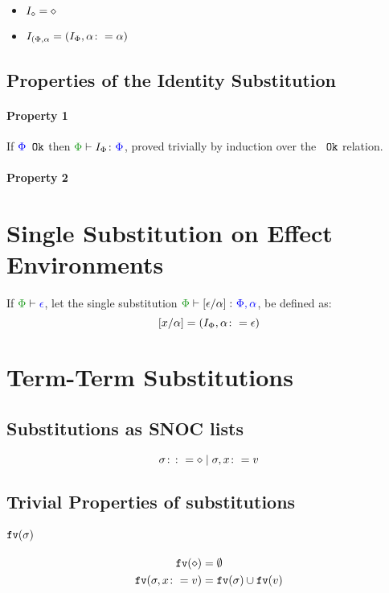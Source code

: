 {\begin{itemize}
\item $I_{\diamond} = \diamond$
\item $I_{(\Phi, \alpha} = (I_{\Phi}, \alpha\colon= \alpha)$
\end{itemize}

\subsection{Properties of the Identity Substitution}
\paragraph{Property 1}
If ${\color{blue} \Phi} \texttt{ Ok}$ then $\typerelation{\P}{I_\P}{\P}$, proved trivially by induction over the ${\color{blue} } \texttt{ Ok}$ relation.

\paragraph{Property 2}
\section{Single Substitution on Effect Environments}

If $\wellformed{\P}{\e}$, let the single substitution $\typerelation{\P}{\ssub{\a}{\e}}{\P,\a}$, be defined as:
\begin{equation}
\left[x / \alpha\right] = (I_{\Phi}, \alpha\colon= \epsilon)
\end{equation}



\section{Term-Term Substitutions}

\subsection{Substitutions as SNOC lists}

\begin{equation}
   \sigma \colon\colon= \diamond \mid \sigma, x \colon= v
\end{equation}

\subsection{Trivial Properties of substitutions}
\paragraph{$\texttt{fv}(\sigma)$}
\begin{align}
    \texttt{fv}(\diamond) &= \emptyset\\
    \texttt{fv}(\sigma, x\colon= v) &= \texttt{fv}(\sigma)\cup\texttt{fv}(v)
\end{align}
}
